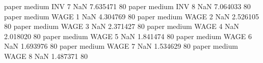             paper     medium      INV                 7                  NaN  7.635471 80
            paper     medium      INV                 8                  NaN  7.064033 80
            paper     medium     WAGE                 1                  NaN  4.304769 80
            paper     medium     WAGE                 2                  NaN  2.526105 80
            paper     medium     WAGE                 3                  NaN  2.371427 80
            paper     medium     WAGE                 4                  NaN  2.018020 80
            paper     medium     WAGE                 5                  NaN  1.841474 80
            paper     medium     WAGE                 6                  NaN  1.693976 80
            paper     medium     WAGE                 7                  NaN  1.534629 80
            paper     medium     WAGE                 8                  NaN  1.487371 80